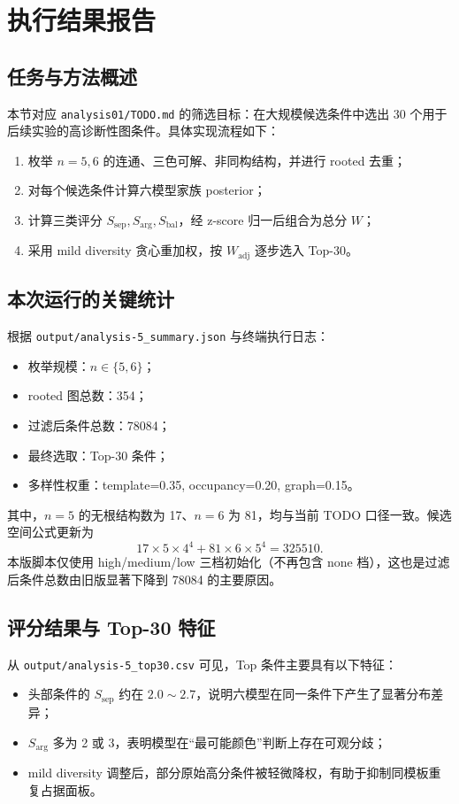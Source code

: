 \section{执行结果报告}

\subsection{任务与方法概述}
本节对应 \texttt{analysis01/TODO.md} 的筛选目标：在大规模候选条件中选出 30 个用于后续实验的高诊断性图条件。具体实现流程如下：
\begin{enumerate}
    \item 枚举 $n=5,6$ 的连通、三色可解、非同构结构，并进行 rooted 去重；
    \item 对每个候选条件计算六模型家族 posterior；
    \item 计算三类评分 $S_{\mathrm{sep}},S_{\mathrm{arg}},S_{\mathrm{bal}}$，经 z-score 归一后组合为总分 $W$；
    \item 采用 mild diversity 贪心重加权，按 $W_{\mathrm{adj}}$ 逐步选入 Top-30。
\end{enumerate}

\subsection{本次运行的关键统计}
根据 \texttt{output/analysis-5\_summary.json} 与终端执行日志：
\begin{itemize}
    \item 枚举规模：$n\in\{5,6\}$；
    \item rooted 图总数：354；
    \item 过滤后条件总数：78084；
    \item 最终选取：Top-30 条件；
    \item 多样性权重：template=0.35, occupancy=0.20, graph=0.15。
\end{itemize}

\noindent
其中，$n=5$ 的无根结构数为 17、$n=6$ 为 81，均与当前 TODO 口径一致。候选空间公式更新为
\[
17\times 5\times 4^4 + 81\times 6\times 5^4 = 325510.
\]
本版脚本仅使用 high/medium/low 三档初始化（不再包含 none 档），这也是过滤后条件总数由旧版显著下降到 78084 的主要原因。

\subsection{评分结果与 Top-30 特征}
从 \texttt{output/analysis-5\_top30.csv} 可见，Top 条件主要具有以下特征：
\begin{itemize}
    \item 头部条件的 $S_{\mathrm{sep}}$ 约在 $2.0\sim 2.7$，说明六模型在同一条件下产生了显著分布差异；
    \item $S_{\mathrm{arg}}$ 多为 2 或 3，表明模型在“最可能颜色”判断上存在可观分歧；
    \item mild diversity 调整后，部分原始高分条件被轻微降权，有助于抑制同模板重复占据面板。
\end{itemize}

